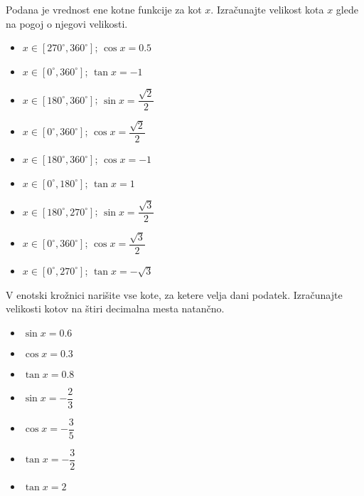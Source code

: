         

  
        
            \begin{naloga}
                Podana je vrednost ene kotne funkcije za kot $x$. 
                Izračunajte velikost kota $x$ glede na pogoj o njegovi velikosti.
                \begin{itemize}
                    
                            \item $x\in[270^\circ,360^\circ]$; $\cos{x}=0.5 $ 
                            \item $x\in[0^\circ,360^\circ]$; $\tan{x}=-1$ 
                            \item $x\in[180^\circ,360^\circ]$; $\sin{x}=\dfrac{\sqrt{2}}{2}$ 
                            \item $x\in[0^\circ,360^\circ]$; $\cos{x}=\dfrac{\sqrt{2}}{2}$ 
                            \item $x\in[180^\circ,360^\circ]$; $\cos{x}=-1$ 
                            \item $x\in[0^\circ,180^\circ]$; $\tan{x}=1$ 
                            \item $x\in[180^\circ,270^\circ]$; $\sin{x}=\dfrac{\sqrt{3}}{2}$ 
                            \item $x\in[0^\circ,360^\circ]$; $\cos{x}=\dfrac{\sqrt{3}}{2}$ 
                            \item $x\in[0^\circ,270^\circ]$; $\tan{x}=-\sqrt{3}$ 
                    
                \end{itemize}
            \end{naloga}

        


        
            \begin{naloga}
                V enotski krožnici narišite vse kote, za ketere velja dani podatek.
                Izračunajte velikosti kotov na štiri decimalna mesta natančno.
                \begin{itemize}
                    
                            \item $\sin{x}=0.6 $ 
                            \item $\cos{x}=0.3 $ 
                            \item $\tan{x}=0.8 $ 
                            \item $\sin{x}=-\dfrac{2}{3} $ 
                            \item $\cos{x}=-\dfrac{3}{5} $ 
                            \item $\tan{x}=-\dfrac{3}{2} $ 
                            \item $\tan{x}=2 $ 
                    
                \end{itemize}
            \end{naloga}

